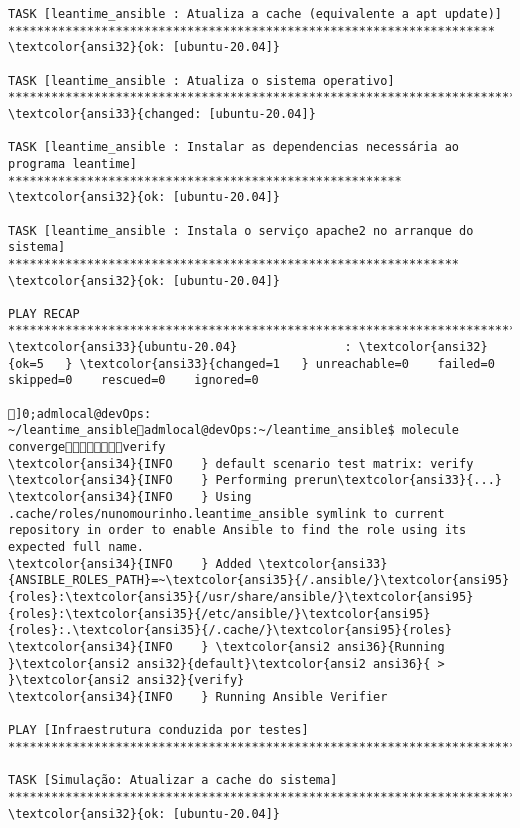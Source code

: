 \documentclass{scrartcl}
\begin{document}
\begin{Verbatim}
TASK [leantime_ansible : Atualiza a cache (equivalente a apt update)] ********************************************************************
\textcolor{ansi32}{ok: [ubuntu-20.04]}

TASK [leantime_ansible : Atualiza o sistema operativo] ***********************************************************************************
\textcolor{ansi33}{changed: [ubuntu-20.04]}

TASK [leantime_ansible : Instalar as dependencias necessária ao programa leantime] *******************************************************
\textcolor{ansi32}{ok: [ubuntu-20.04]}

TASK [leantime_ansible : Instala o serviço apache2 no arranque do sistema] ***************************************************************
\textcolor{ansi32}{ok: [ubuntu-20.04]}

PLAY RECAP *******************************************************************************************************************************
\textcolor{ansi33}{ubuntu-20.04}               : \textcolor{ansi32}{ok=5   } \textcolor{ansi33}{changed=1   } unreachable=0    failed=0    skipped=0    rescued=0    ignored=0

]0;admlocal@devOps: ~/leantime_ansibleadmlocal@devOps:~/leantime_ansible$ molecule convergeverify
\textcolor{ansi34}{INFO    } default scenario test matrix: verify
\textcolor{ansi34}{INFO    } Performing prerun\textcolor{ansi33}{...}
\textcolor{ansi34}{INFO    } Using .cache/roles/nunomourinho.leantime_ansible symlink to current repository in order to enable Ansible to find the role using its expected full name.
\textcolor{ansi34}{INFO    } Added \textcolor{ansi33}{ANSIBLE_ROLES_PATH}=~\textcolor{ansi35}{/.ansible/}\textcolor{ansi95}{roles}:\textcolor{ansi35}{/usr/share/ansible/}\textcolor{ansi95}{roles}:\textcolor{ansi35}{/etc/ansible/}\textcolor{ansi95}{roles}:.\textcolor{ansi35}{/.cache/}\textcolor{ansi95}{roles}
\textcolor{ansi34}{INFO    } \textcolor{ansi2 ansi36}{Running }\textcolor{ansi2 ansi32}{default}\textcolor{ansi2 ansi36}{ > }\textcolor{ansi2 ansi32}{verify}
\textcolor{ansi34}{INFO    } Running Ansible Verifier

PLAY [Infraestrutura conduzida por testes] ***********************************************************************************************

TASK [Simulação: Atualizar a cache do sistema] *******************************************************************************************
\textcolor{ansi32}{ok: [ubuntu-20.04]}


\end{Verbatim}
\end{document}
